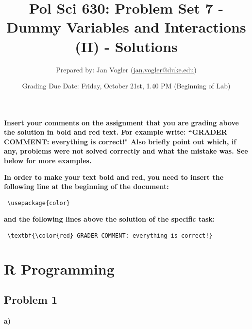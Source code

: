 \documentclass[12pt]{article}\usepackage[]{graphicx}\usepackage[]{color}
\begin{document}
\title{Pol Sci 630: Problem Set 7 - Dummy Variables and Interactions (II) - Solutions}

\author{Prepared by: Jan Vogler (\href{mailto:jan.vogler@duke.edu}{jan.vogler@duke.edu})}

\date{Grading Due Date: Friday, October 21st, 1.40 PM (Beginning of Lab)}

\maketitle



\textbf{\color{red} Insert your comments on the assignment that you are grading above the solution in bold and red text. For example write: ``GRADER COMMENT: everything is correct!" Also briefly point out which, if any, problems were not solved correctly and what the mistake was. See below for more examples.}

\bigskip

\textbf{In order to make your text bold and red, you need to insert the following line at the beginning of the document:}

\begin{verbatim} \usepackage{color} \end{verbatim}

\bigskip

\textbf{and the following lines above the solution of the specific task:}

\begin{verbatim} \textbf{\color{red} GRADER COMMENT: everything is correct!} \end{verbatim}



\pagebreak

\section*{R Programming}

\subsection*{Problem 1}

\paragraph{a)}
\end{document}
